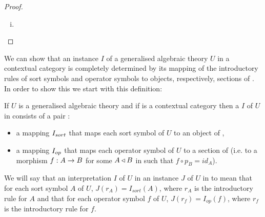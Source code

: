 \begin{proof}
\begin{enumerate}[(i)]
\item 
\end{enumerate}
\end{proof}
We can show that an instance $I$ of a generalised algebraic theory $U$ in a contextual category \catcw is
completely determined by its mapping of the introductory rules of sort symbols and operator symbols to
objects, respectively, sections of \catc. In order to show this we start with this definition:
\begin{definition}
If $U$ is a generalised algebraic theory  and if \catcw is a contextual category then
a  $I$ of  $U$ in \catcw consists of a pair :
\begin{itemize}
\item a mapping $I_{sort}$ that maps each sort symbol of $U$ to  an object of \catc,
\item a mapping $I_{op}$ that maps each operator symbol of $U$ to a section of \catcw (i.e. to a morphism $f: A \rightarrow B$ for some 
$A \triangleleft B$ in \catcw such that $f \circ p_B=id_A$).
\end{itemize}
\end{definition}


We will say that  an interpretation $I$ of $U$ in \catcw {} an  instance $J$ of $U$ in \catcw to mean that for each sort symbol $A$ of $U$,
$J(r_A) = I_{sort}(A)$, where $r_A$ is the introductory rule for $A$ and that for each operator symbol
$f$ of $U$,   $J(r_f) = I_{op}(f)$, where $r_f$ is the introductory rule for $f$.

\newcommand{\Ibar}{\mkern 2.5mu\overline{\mkern-2.5mu I\mkern1.5mu}\mkern -1.5mu}

